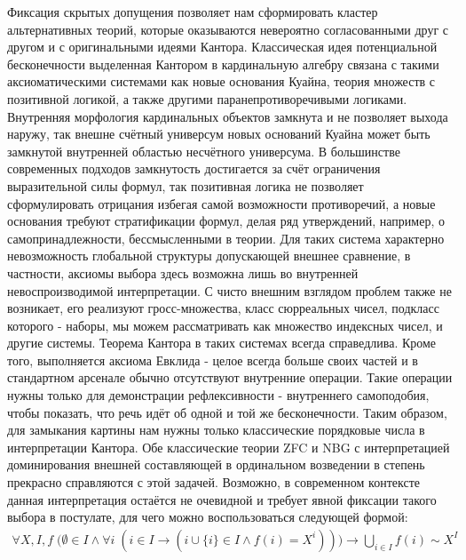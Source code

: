 \documentclass[12pt]{article}
\begin{document}
Фиксация скрытых допущения позволяет нам сформировать кластер альтернативных теорий, которые оказываются невероятно согласованными друг с другом и с оригинальными идеями Кантора. Классическая идея потенциальной бесконечности выделенная Кантором в кардинальную алгебру связана с такими аксиоматическими системами как новые основания Куайна, теория множеств с позитивной логикой, а также другими паранепротиворечивыми логиками. Внутренняя морфология кардинальных объектов замкнута и не позволяет выхода наружу, так внешне счётный универсум новых оснований Куайна может быть замкнутой внутренней областью несчётного универсума. В большинстве современных подходов замкнутость достигается за счёт ограничения выразительной силы формул, так позитивная логика не позволяет сформулировать отрицания избегая самой возможности противоречий, а новые основания требуют стратификации формул, делая ряд утверждений, например, о самопринадлежности, бессмысленными в теории. Для таких система характерно невозможность глобальной структуры допускающей внешнее сравнение, в частности, аксиомы выбора здесь возможна лишь во внутренней невоспроизводимой интерпретации. С чисто внешним взглядом проблем также не возникает, его реализуют гросс-множества, класс сюрреальных чисел, подкласс которого - наборы, мы можем рассматривать как множество индексных чисел, и другие системы. Теорема Кантора в таких системах всегда справедлива. Кроме того, выполняется аксиома Евклида - целое всегда больше своих частей и в стандартном арсенале обычно отсутствуют внутренние операции. Такие операции нужны только для демонстрации рефлексивности - внутреннего самоподобия, чтобы показать, что речь идёт об одной и той же бесконечности. Таким образом, для замыкания картины нам нужны только классические порядковые числа в интерпретации Кантора. Обе классические теории ZFC и NBG с интерпретацией доминирования внешней составляющей в ординальном возведении в степень прекрасно справляются с этой задачей. Возможно, в современном контексте данная интерпретация остаётся не очевидной и требует явной фиксации такого выбора в постулате, для чего можно воспользоваться следующей формой:
\begin{equation}
\begin{gathered}
\forall X, I, f \; \bigl(\emptyset \in I \wedge \forall i \; (i \in I \to (i \cup \{ i \} \in I \wedge f(i) = X^i)) \bigr) \to \bigcup_{i \in I} f(i) \sim X^I
\label{axiom:secure-induction}
\end{gathered}
\end{equation}
\end{document}
